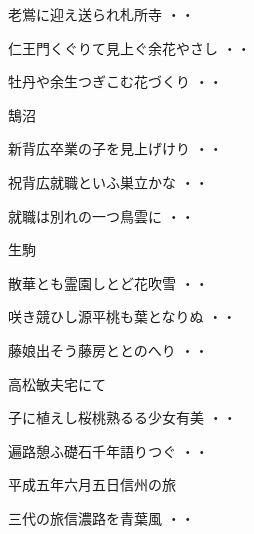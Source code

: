 \begin{shiika}老鴬に迎え送られ札所寺
\hfill{・・}\end{shiika}
\begin{shiika}仁王門くぐりて見上ぐ余花やさし
\hfill{・・}\end{shiika}
\begin{shiika}牡丹や余生つぎこむ花づくり
\hfill{・・}\end{shiika}
\vspace{0.6cm}
鵠沼
\begin{shiika}新背広卒業の子を見上げけり
\hfill{・・}\end{shiika}
\begin{shiika}祝背広就職といふ巣立かな
\hfill{・・}\end{shiika}
\begin{shiika}就職は別れの一つ鳥雲に
\hfill{・・}\end{shiika}
\vspace{0.6cm}
生駒
\begin{shiika}散華とも霊園しとど花吹雪
\hfill{・・}\end{shiika}
\vspace{0.6cm}
\begin{shiika}咲き競ひし源平桃も葉となりぬ
\hfill{・・}\end{shiika}
\vspace{0.6cm}
\begin{shiika}藤娘出そう藤房ととのへり
\hfill{・・}\end{shiika}
\vspace{0.6cm}
高松敏夫宅にて
\begin{shiika}子に植えし桜桃熟るる少女有美
\hfill{・・}\end{shiika}
\vspace{0.6cm}
\begin{shiika}遍路憩ふ礎石千年語りつぐ
\hfill{・・}\end{shiika}
\vspace{0.6cm}
平成五年六月五日信州の旅
\begin{shiika}三代の旅信濃路を青葉風
\hfill{・・}\end{shiika}
